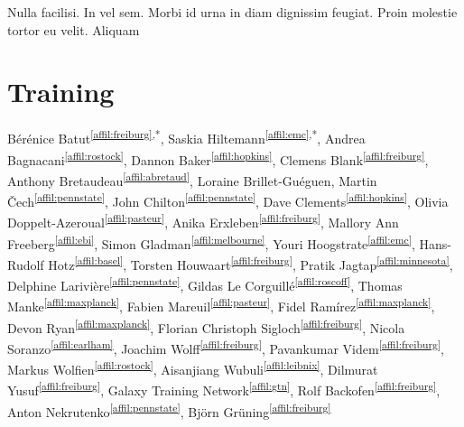 \begin{savequote}[75mm]
Nulla facilisi. In vel sem. Morbi id urna in diam dignissim feugiat. Proin molestie tortor eu velit. Aliquam
\end{savequote}

\chapter{Training}
\label{training}
\setcounter{figure}{-1}
\setcounter{table}{-1}
\setcounter{section}{-1}

\newpage
{}
Bérénice Batut\textsuperscript{\ref{affil:freiburg},*},
Saskia Hiltemann\textsuperscript{\ref{affil:emc},*},
Andrea Bagnacani\textsuperscript{\ref{affil:rostock}},
Dannon Baker\textsuperscript{\ref{affil:hopkins}},
Clemens Blank\textsuperscript{\ref{affil:freiburg}},
Anthony Bretaudeau\textsuperscript{\ref{affil:abretaud}},
Loraine Brillet-Guéguen\textsuperscript{\label{affil:roscoff}},
Martin Čech\textsuperscript{\ref{affil:pennstate}},
John Chilton\textsuperscript{\ref{affil:pennstate}},
Dave Clements\textsuperscript{\ref{affil:hopkins}},
Olivia Doppelt-Azeroual\textsuperscript{\ref{affil:pasteur}},
Anika Erxleben\textsuperscript{\ref{affil:freiburg}},
Mallory Ann Freeberg\textsuperscript{\ref{affil:ebi}},
Simon Gladman\textsuperscript{\ref{affil:melbourne}},
Youri Hoogstrate\textsuperscript{\ref{affil:emc}},
Hans-Rudolf Hotz\textsuperscript{\ref{affil:basel}},
Torsten Houwaart\textsuperscript{\ref{affil:freiburg}},
Pratik Jagtap\textsuperscript{\ref{affil:minnesota}},
Delphine Larivière\textsuperscript{\ref{affil:pennstate}},
Gildas Le Corguillé\textsuperscript{\ref{affil:roscoff}},
Thomas Manke\textsuperscript{\ref{affil:maxplanck}},
Fabien Mareuil\textsuperscript{\ref{affil:pasteur}},
Fidel Ramírez\textsuperscript{\ref{affil:maxplanck}},
Devon Ryan\textsuperscript{\ref{affil:maxplanck}},
Florian Christoph Sigloch\textsuperscript{\ref{affil:freiburg}},
Nicola Soranzo\textsuperscript{\ref{affil:earlham}},
Joachim Wolff\textsuperscript{\ref{affil:freiburg}},
Pavankumar Videm\textsuperscript{\ref{affil:freiburg}},
Markus Wolfien\textsuperscript{\ref{affil:rostock}},
Aisanjiang Wubuli\textsuperscript{\ref{affil:leibnix}},
Dilmurat Yusuf\textsuperscript{\ref{affil:freiburg}},
Galaxy Training Network\textsuperscript{\ref{affil:gtn}},
Rolf Backofen\textsuperscript{\ref{affil:freiburg}},
Anton Nekrutenko\textsuperscript{\ref{affil:pennstate}},
Björn Grüning\textsuperscript{\ref{affil:freiburg}}

